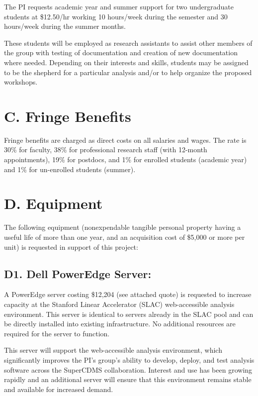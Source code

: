 \documentclass[11pt,oneside]{memoir}
\begin{document}
The PI requests academic year and summer support for two undergraduate students at \$12.50/hr working 10 hours/week during the semester and 30 hours/week during the summer months.

These students will be employed as research assistants to assist other members of the group with testing of documentation and creation of new documentation where needed.  Depending on their interests and skills, students may be assigned to be the shepherd for a particular analysis and/or to help organize the proposed workshops.  


\section*{C. Fringe Benefits} 

Fringe benefits are charged as direct costs on all salaries and wages. The rate is 30\% for faculty, 38\% for professional research staff (with 12-month appointments), 19\% for postdocs, and 1\% for enrolled students (academic year) and 1\% for un-enrolled students (summer).

\section*{D. Equipment}
The following equipment (nonexpendable tangible personal property having a useful life of more than one year, and an acquisition cost of \$5,000 or more per unit) is requested in support of this project:

\subsection{D1. Dell PowerEdge Server:}  A PowerEdge server costing \$12,204 (see attached quote) is requested to increase capacity at the Stanford Linear Accelerator (SLAC) web-accessible analysis environment.  This server is identical to servers already in the SLAC pool and can be directly installed into existing infrastructure.  No additional resources are required for the server to function.

This server will support the web-accessible analysis environment, which significantly improves the PI's group's ability to develop, deploy, and test analysis software across the SuperCDMS collaboration.  Interest and use has been growing rapidly and an additional server will ensure that this environment remains stable and available for increased demand.
\end{document}
